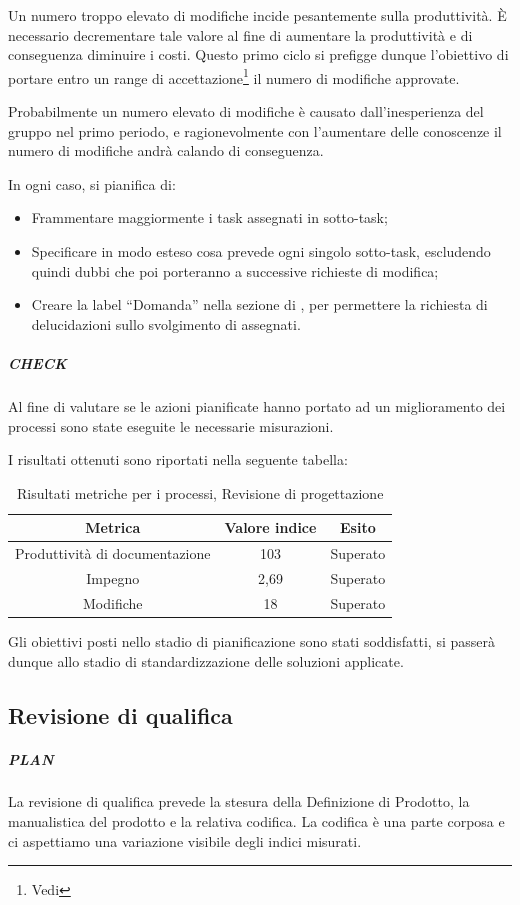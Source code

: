 Un numero troppo elevato di modifiche incide pesantemente sulla produttività. È necessario decrementare tale valore al fine di aumentare la produttività e di conseguenza diminuire i costi. Questo primo ciclo  si prefigge dunque l'obiettivo di portare entro un range di accettazione\footnote{Vedi \PianoDiQualifica} il numero di modifiche approvate.

Probabilmente un numero elevato di modifiche è causato dall'inesperienza del gruppo nel primo periodo, e ragionevolmente con l'aumentare delle conoscenze il numero di modifiche andrà calando di conseguenza. 

In ogni caso, si pianifica di:
\begin{itemize}
\item Frammentare maggiormente i task assegnati in sotto-task;
\item Specificare in modo esteso cosa prevede ogni singolo sotto-task, escludendo quindi dubbi che poi porteranno a successive richieste di modifica;
\item Creare la label ``Domanda'' nella sezione  di , per permettere la richiesta di delucidazioni sullo svolgimento di  assegnati.
\end{itemize}
  
\subparagraph{CHECK}

Al fine di valutare se le azioni pianificate hanno portato ad un miglioramento dei processi sono state eseguite le necessarie misurazioni.

I risultati ottenuti sono riportati nella seguente tabella:
\begin{table}[H]
\centering
\begin{tabular}{ | c | c | c | }
\hline
\textbf{Metrica} & \textbf{Valore indice} & \textbf{Esito} \\
\hline
Produttività di documentazione & 103 & Superato \\
\hline
Impegno & 2,69 & Superato \\
\hline
Modifiche & 18 & Superato \\
\hline
\end{tabular}
\caption{Risultati metriche per i processi, Revisione di progettazione}
\end{table}

Gli obiettivi posti nello stadio di pianificazione sono stati soddisfatti, si passerà dunque allo stadio di standardizzazione delle soluzioni applicate.


\newpage
\subsection{Revisione di qualifica}
	\subparagraph{PLAN}
	La revisione di qualifica prevede la stesura della Definizione di Prodotto, la manualistica del prodotto e la relativa codifica. La codifica è una parte corposa e ci aspettiamo una variazione visibile degli indici misurati.

